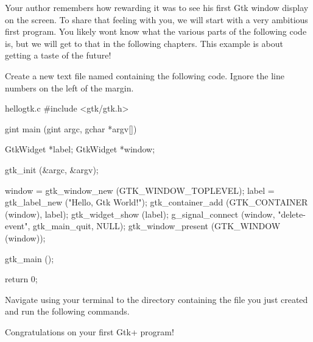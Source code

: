 Your author remembers how rewarding it was to see his first Gtk window display
on the screen. To share that feeling with you, we will start with a very
ambitious first program. You likely wont know what the various parts of the
following code is, but we will get to that in the following chapters. This
example is about getting a taste of the future!

Create a new text file named  containing the following code.
Ignore the line numbers on the left of the margin.

\begin{code}{hellogtk.c}
#include <gtk/gtk.h>

gint
main (gint   argc,
      gchar *argv[])
{
    GtkWidget *label;
    GtkWidget *window;

    gtk_init (&argc, &argv);

    window = gtk_window_new (GTK_WINDOW_TOPLEVEL);
    label = gtk_label_new ("Hello, Gtk World!");
    gtk_container_add (GTK_CONTAINER (window), label);
    gtk_widget_show (label);
    g_signal_connect (window, "delete-event", gtk_main_quit, NULL);
    gtk_window_present (GTK_WINDOW (window));

    gtk_main ();

    return 0;
}
\end{code}

Navigate using your terminal to the directory containing the file you just
created and run the following commands.


Congratulations on your first Gtk+ program!
